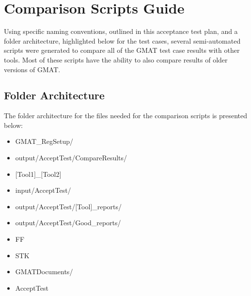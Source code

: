 \chapter{Comparison Scripts Guide}
\label{Ch:CompScripts}

Using specific naming conventions, outlined in this acceptance test
plan, and a folder architecture, highlighted below for the test
cases, several semi-automated scripts were generated to compare all
of the GMAT test case results with other tools. Most of these
scripts have the ability to also compare results of older versions
of GMAT.

\section{Folder Architecture}\label{Sec:FolderArch}
The folder architecture for the files needed for the comparison
scripts is presented below:

\begin{itemize}
    \itemindent -0.1in
    \item GMAT\_RegSetup/
        \itemindent 0.1in
        \item output/AcceptTest/CompareResults/
            \itemindent 0.3in
            \item $[$Tool1$]$\_$[$Tool2$]$
        \itemindent 0.1in
        \item input/AcceptTest/
        \item output/AcceptTest/$[$Tool$]$\_reports/
        \item output/AcceptTest/Good\_reports/
            \itemindent 0.3in
            \item FF
            \item STK
    \itemindent -0.1in
    \item GMATDocuments/
        \itemindent 0.1in
        \item AcceptTest
\end{itemize}

